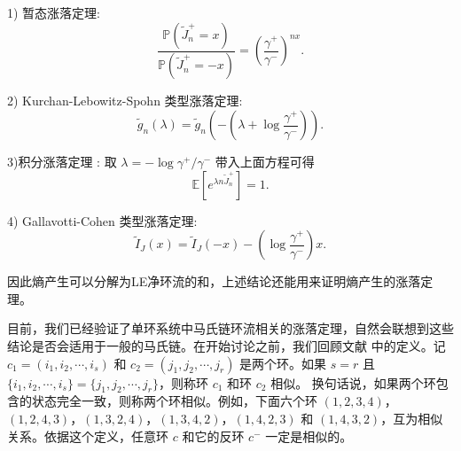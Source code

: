 1) 暂态涨落定理:
\begin{equation*}
\frac{\mathbb{P}(\tilde{J}^+_n=x)}{\mathbb{P}(\tilde{J}^+_n=-x)}
= \left(\frac{\gamma^+}{\gamma^-}\right)^{nx}.
\end{equation*}

2) Kurchan-Lebowitz-Spohn 类型涨落定理:
\begin{equation*}
\tilde{g}_n(\lambda)=\tilde{g}_n\left(-\left(\lambda+\log\frac{\gamma^+}{\gamma^-}\right)\right).
\end{equation*}

3)积分涨落定理 : 取 $\lambda = -\log \gamma^+/\gamma^-$ 带入上面方程可得
\begin{equation*}
\mathbb{E}\left[e^{\lambda n\tilde{J}^+_n}\right]=1.
\end{equation*}

4) Gallavotti-Cohen 类型涨落定理:
\begin{equation*}
\tilde{I}_J(x)=\tilde{I}_J(-x)-\left(\log\frac{\gamma^+}{\gamma^-}\right)x.
\end{equation*}

因此熵产生可以分解为LE净环流\cite{Seifert_2012}的和，上述结论还能用来证明熵产生的涨落定理。


目前，我们已经验证了单环系统中马氏链环流相关的涨落定理，自然会联想到这些结论是否会适用于一般的马氏链。在开始讨论之前，我们回顾文献 \cite{jia2016cycle}中的定义。记 $c_1=(i_1,i_2,\cdots,i_s)$ 和 $c_2=(j_1,j_2,\cdots,j_r)$ 是两个环。如果 $s=r$ 且 $\{i_1,i_2,\cdots,i_s\}=\{j_1,j_2,\cdots,j_r\}$，则称环 $c_1$ 和环 $c_2$ 相似。
换句话说，如果两个环包含的状态完全一致，则称两个环相似。例如，下面六个环 $(1,2,3,4)$，$(1,2,4,3)$，$(1,3,2,4)$，$(1,3,4,2)$，$(1,4,2,3)$ 和 $(1,4,3,2)$，互为相似关系。依据这个定义，任意环 $c$ 和它的反环 $c^-$ 一定是相似的。

